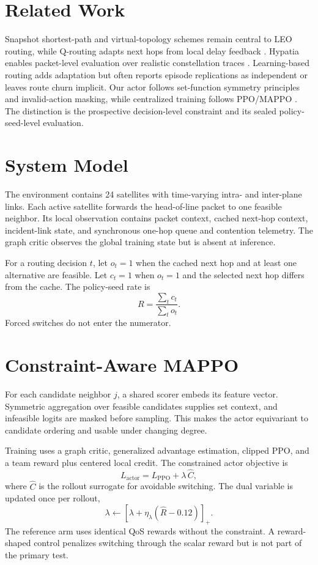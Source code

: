 \documentclass[conference]{IEEEtran}
\begin{document}
\section{Related Work}
Snapshot shortest-path and virtual-topology schemes remain central to LEO
routing, while Q-routing adapts next hops from local delay feedback
\cite{boyan1994q}. Hypatia enables packet-level evaluation over realistic
constellation traces \cite{klenze2020hypatia}. Learning-based routing adds
adaptation but often reports episode replications as independent or leaves
route churn implicit. Our actor follows set-function symmetry principles
\cite{zaheer2017deepsets} and invalid-action masking, while centralized
training follows PPO/MAPPO \cite{schulman2017ppo,yu2022mappo}. The distinction
is the prospective decision-level constraint and its sealed policy-seed-level
evaluation.

\section{System Model}
The environment contains 24 satellites with time-varying intra- and
inter-plane links. Each active satellite forwards the head-of-line packet to
one feasible neighbor. Its local observation contains packet context, cached
next-hop context, incident-link state, and synchronous one-hop queue and
contention telemetry. The graph critic observes the global training state but
is absent at inference.

For a routing decision $t$, let $o_t=1$ when the cached next hop and at least
one alternative are feasible. Let $c_t=1$ when $o_t=1$ and the selected next
hop differs from the cache. The policy-seed rate is
\begin{equation}
 R=\frac{\sum_t c_t}{\sum_t o_t}.
\end{equation}
Forced switches do not enter the numerator.

\section{Constraint-Aware MAPPO}
For each candidate neighbor $j$, a shared scorer embeds its feature vector.
Symmetric aggregation over feasible candidates supplies set context, and
infeasible logits are masked before sampling. This makes the actor equivariant
to candidate ordering and usable under changing degree.

Training uses a graph critic, generalized advantage estimation, clipped PPO,
and a team reward plus centered local credit. The constrained actor objective
is
\begin{equation}
 L_{\mathrm{actor}}=L_{\mathrm{PPO}}+\lambda\,\widehat C,
\end{equation}
where $\widehat C$ is the rollout surrogate for avoidable switching. The dual
variable is updated once per rollout,
\begin{equation}
 \lambda\leftarrow[\lambda+\eta_\lambda(\widehat R-0.12)]_+.
\end{equation}
The reference arm uses identical QoS rewards without the constraint. A
reward-shaped control penalizes switching through the scalar reward but is not
part of the primary test.
\end{document}
